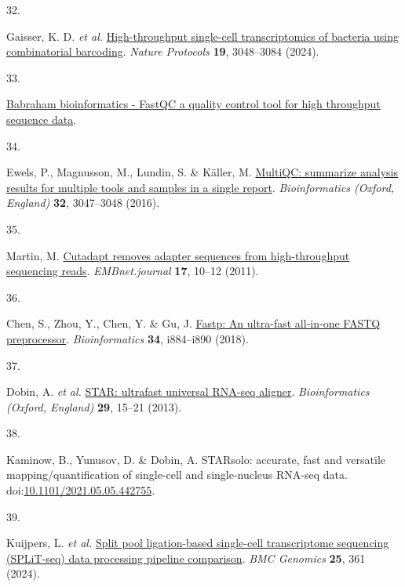 \documentclass[
  11pt,
  a4paper,
]{report}
\newlength{\cslhangindent}
\newlength{\csllabelwidth}
\newenvironment{CSLReferences}[2] %
 {\begin{list}{}{%
  \setlength{\itemindent}{0pt}
  \setlength{\leftmargin}{0pt}
  \setlength{\parsep}{0pt}
  \ifodd #1
   \setlength{\leftmargin}{\cslhangindent}
   \setlength{\itemindent}{-1\cslhangindent}
  \fi
  \setlength{\itemsep}{#2\baselineskip}}}
 {\end{list}}
\newcommand{\CSLLeftMargin}[1]{\parbox[t]{\csllabelwidth}{\strut#1\strut}}
\newcommand{\CSLRightInline}[1]{\parbox[t]{\linewidth - \csllabelwidth}{\strut#1\strut}}
\begin{document}
\begin{CSLReferences}{0}{0}
\CSLLeftMargin{32. }%
\CSLRightInline{Gaisser, K. D. \emph{et al.}
\href{https://doi.org/10.1038/s41596-024-01007-w}{High-throughput
single-cell transcriptomics of bacteria using combinatorial barcoding}.
\emph{Nature Protocols} \textbf{19}, 3048--3084 (2024).}

\CSLLeftMargin{33. }%
\CSLRightInline{\href{https://www.bioinformatics.babraham.ac.uk/projects/fastqc/}{Babraham
bioinformatics - FastQC a quality control tool for high throughput
sequence data}.}

\CSLLeftMargin{34. }%
\CSLRightInline{Ewels, P., Magnusson, M., Lundin, S. \& Käller, M.
\href{https://doi.org/10.1093/bioinformatics/btw354}{MultiQC: summarize
analysis results for multiple tools and samples in a single report}.
\emph{Bioinformatics (Oxford, England)} \textbf{32}, 3047--3048 (2016).}

\CSLLeftMargin{35. }%
\CSLRightInline{Martin, M.
\href{https://doi.org/10.14806/ej.17.1.200}{Cutadapt removes adapter
sequences from high-throughput sequencing reads}. \emph{EMBnet.journal}
\textbf{17}, 10--12 (2011).}

\CSLLeftMargin{36. }%
\CSLRightInline{Chen, S., Zhou, Y., Chen, Y. \& Gu, J.
\href{https://doi.org/10.1093/bioinformatics/bty560}{Fastp: An
ultra-fast all-in-one FASTQ preprocessor}. \emph{Bioinformatics}
\textbf{34}, i884--i890 (2018).}

\CSLLeftMargin{37. }%
\CSLRightInline{Dobin, A. \emph{et al.}
\href{https://doi.org/10.1093/bioinformatics/bts635}{STAR: ultrafast
universal RNA-seq aligner}. \emph{Bioinformatics (Oxford, England)}
\textbf{29}, 15--21 (2013).}

\CSLLeftMargin{38. }%
\CSLRightInline{Kaminow, B., Yunusov, D. \& Dobin, A. STARsolo:
accurate, fast and versatile mapping/quantification of single-cell and
single-nucleus RNA-seq data.
doi:\href{https://doi.org/10.1101/2021.05.05.442755}{10.1101/2021.05.05.442755}.}

\CSLLeftMargin{39. }%
\CSLRightInline{Kuijpers, L. \emph{et al.}
\href{https://doi.org/10.1186/s12864-024-10285-3}{Split pool
ligation-based single-cell transcriptome sequencing (SPLiT-seq) data
processing pipeline comparison}. \emph{BMC Genomics} \textbf{25}, 361
(2024).}


\end{CSLReferences}
\end{document}
